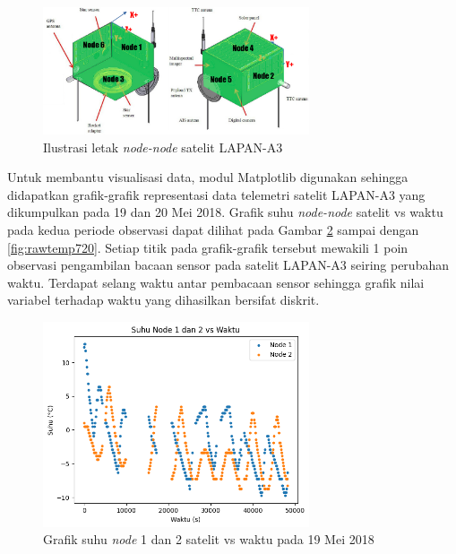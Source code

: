 \begin{figure}[H]
\setlength{}
\begin{center}
\includegraphics[width=0.7\textwidth]{fig/a3node.png}
	\caption{Ilustrasi letak \textit{node-node} satelit LAPAN-A3}
\label{fig:a3node}
\end{center}
\end{figure}

Untuk membantu visualisasi data, modul Matplotlib digunakan sehingga didapatkan
grafik-grafik representasi data telemetri satelit LAPAN-A3 yang dikumpulkan
pada 19 dan 20 Mei 2018. Grafik suhu \textit{node-node} satelit vs waktu pada
kedua periode observasi dapat dilihat pada Gambar \ref{fig:rawtemp1219} sampai
dengan \ref{fig:rawtemp720}. Setiap titik pada grafik-grafik tersebut mewakili
1 poin observasi pengambilan bacaan sensor pada satelit LAPAN-A3 seiring
perubahan waktu. Terdapat selang waktu antar pembacaan sensor sehingga grafik
nilai variabel terhadap waktu yang dihasilkan bersifat diskrit.

\begin{figure}[H]
\setlength{}
\begin{center}
\includegraphics[width=0.7\textwidth]{fig/raw_node12_temp_2018-05-19.png}
	\caption{Grafik suhu \textit{node} 1 dan 2 satelit vs waktu pada 19 Mei 2018}
\label{fig:rawtemp1219}
\end{center}
\end{figure}

